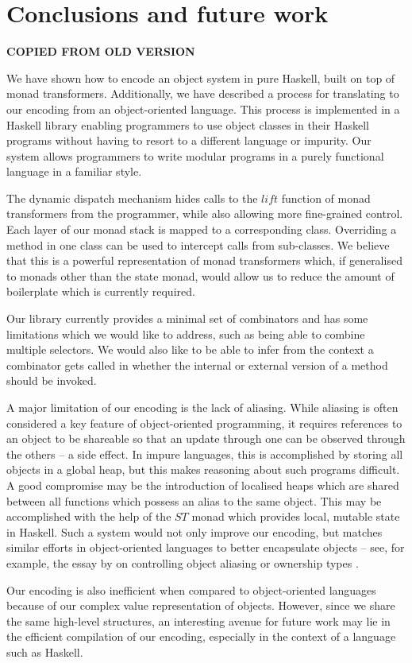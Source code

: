 \section{Conclusions and future work}
\label{sec:conclusions}

\textbf{COPIED FROM OLD VERSION}

We have shown how to encode an object system in pure Haskell, built on top of monad transformers. Additionally, we have described a process for translating to our encoding from an object-oriented language. This process is implemented in a Haskell library enabling programmers to use object classes in their Haskell programs without having to resort to a different language or impurity. Our system allows programmers to write modular programs in a purely functional language in a familiar style. 

The dynamic dispatch mechanism hides calls to the $\mathit{lift}$ function of monad transformers from the programmer, while also allowing more fine-grained control. Each layer of our monad stack is mapped to a corresponding class. Overriding a method in one class can be used to intercept calls from sub-classes. We believe that this is a powerful representation of monad transformers which, if generalised to monads other than the state monad, would allow us to reduce the amount of boilerplate which is currently required.

Our library currently provides a minimal set of combinators and has some limitations which we would like to address, such as being able to combine multiple selectors. We would also like to be able to infer from the context a combinator gets called in whether the internal or external version of a method should be invoked.

A major limitation of our encoding is the lack of aliasing. While aliasing is often considered a key feature of object-oriented programming, it requires references to an object to be shareable so that an update through one can be observed through the others -- a side effect. In impure languages, this is accomplished by storing all objects in a global heap, but this makes reasoning about such programs difficult. A good compromise may be the introduction of localised heaps which are shared between all functions which possess an alias to the same object. This may be accomplished with the help of the $\mathit{ST}$ monad \cite{launchbury1995state} which provides local, mutable state in Haskell. Such a system would not only improve our encoding, but matches similar efforts in object-oriented languages to better encapsulate objects -- see, for example, the essay by \citet{hogg1992geneva} on controlling object aliasing or ownership types \cite{clarke1998ownership}.

Our encoding is also inefficient when compared to object-oriented languages because of our complex value representation of objects. However, since we share the same high-level structures, an interesting avenue for future work may lie in the efficient compilation of our encoding, especially in the context of a language such as Haskell. 

